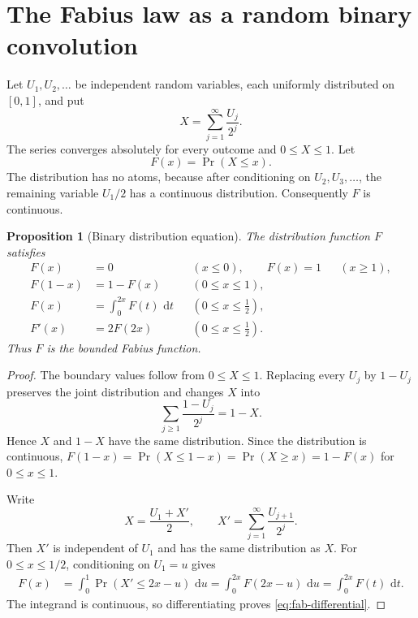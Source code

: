 \documentclass[11pt,oneside,openany]{book}
\newtheorem{proposition}[theorem]{Proposition}
\theoremstyle{definition}
\theoremstyle{remark}
\newcommand{\dd}{\,\mathrm d}
\begin{document}
\section{The Fabius law as a random binary convolution}

Let $U_1,U_2,\ldots$ be independent random variables, each uniformly distributed on $[0,1]$, and put
\begin{equation}
 X=\sum_{j=1}^{\infty}\frac{U_j}{2^j}.
 \label{eq:fab-X}
\end{equation}
The series converges absolutely for every outcome and $0\le X\le1$.  Let
\[
 F(x)=\Pr(X\le x).
\]
The distribution has no atoms, because after conditioning on $U_2,U_3,\ldots$, the remaining variable $U_1/2$ has a continuous distribution.  Consequently $F$ is continuous.

\begin{proposition}[Binary distribution equation]\label{prop:fab-distribution}
The distribution function $F$ satisfies
\begin{align}
 F(x)&=0 &&(x\le0),\qquad F(x)=1 &&(x\ge1),\label{eq:fab-boundary}\\
 F(1-x)&=1-F(x) &&(0\le x\le1),\label{eq:fab-symmetry}\\
 F(x)&=\int_0^{2x}F(t)\,\dd t &&(0\le x\le\tfrac12),\label{eq:fab-integral}\\
 F'(x)&=2F(2x) &&(0\le x\le\tfrac12).\label{eq:fab-differential}
\end{align}
Thus $F$ is the bounded Fabius function.
\end{proposition}

\begin{proof}
The boundary values follow from $0\le X\le1$.  Replacing every $U_j$ by $1-U_j$ preserves the joint distribution and changes $X$ into
\[
 \sum_{j\ge1}\frac{1-U_j}{2^j}=1-X.
\]
Hence $X$ and $1-X$ have the same distribution.  Since the distribution is continuous,
\(
 F(1-x)=\Pr(X\le1-x)=\Pr(X\ge x)=1-F(x)
\)
for $0\le x\le1$.

Write
\[
 X=\frac{U_1+X'}2,
 \qquad
 X'=\sum_{j=1}^{\infty}\frac{U_{j+1}}{2^j}.
\]
Then $X'$ is independent of $U_1$ and has the same distribution as $X$.  For $0\le x\le1/2$, conditioning on $U_1=u$ gives
\begin{align*}
 F(x)
 &=\int_0^1\Pr(X'\le2x-u)\,\dd u
 =\int_0^{2x}F(2x-u)\,\dd u
 =\int_0^{2x}F(t)\,\dd t.
\end{align*}
The integrand is continuous, so differentiating proves \eqref{eq:fab-differential}.
\end{proof}
\end{document}
